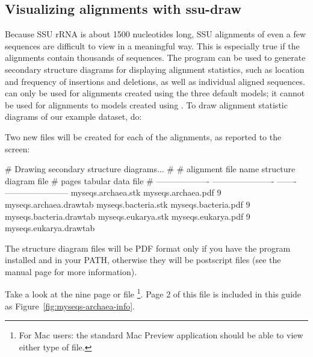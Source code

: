 \subsection{Visualizing alignments with ssu-draw}

Because SSU rRNA is about 1500 nucleotides long, SSU alignments of
even a few sequences are difficult to view in a meaningful way. This
is especially true if the alignments contain thousands of sequences.
The  program can be used to generate secondary
structure diagrams for displaying alignment statistics, such as
location and frequency of insertions and deletions, as well as
individual aligned sequences.  can only be used for
alignments created using the three default models; it cannot be used
for alignments to models created using .  To draw
alignment statistic diagrams of our  example dataset, do:


Two new files will be created for each of the alignments, as reported
to the screen:

\begin{sreoutput}
# Drawing secondary structure diagrams...
#
# alignment file name  structure diagram file  # pages  tabular data file      
# -------------------  ----------------------  -------  -----------------------
  myseqs.archaea.stk   myseqs.archaea.pdf            9  myseqs.archaea.drawtab 
  myseqs.bacteria.stk  myseqs.bacteria.pdf           9  myseqs.bacteria.drawtab
  myseqs.eukarya.stk   myseqs.eukarya.pdf            9  myseqs.eukarya.drawtab 
\end{sreoutput}

The structure diagram files will be PDF format only if you have the
program  installed and in your PATH, otherwise they will
be postscript files (see the  manual page for more
information). 

Take a look at the nine page  or
 file \footnote{For Mac users: the standard
  Mac Preview application should be able to view either type of
  file.}.  Page 2 of this file is included in this guide as
Figure~\ref{fig:myseqs-archaea-info}.

